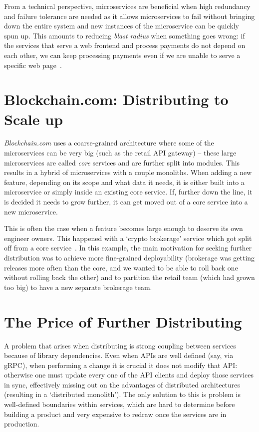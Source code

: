 \documentclass[conference]{IEEEtran}
\begin{document}
    From a technical perspective, microservices are beneficial when high redundancy and failure tolerance are needed as it allows microservices to fail without bringing down the entire system and new instances of the microservice can be quickly spun up. This amounts to reducing \emph{blast radius} when something
    goes wrong: if the services that serve a web frontend and process payments do
    not depend on each other, we can keep processing payments even if we are unable
    to serve a specific web page~\cite{blastRadius}.



    \section{Blockchain.com: Distributing to Scale up}
    \textit{Blockchain.com} uses a coarse-grained architecture where some of the microservices can be very big
    (such as the retail API gateway) -- these large microservices are called \emph{core} services and are further split into modules.
    This results in a hybrid of microservices with a couple monoliths.
    When adding a new feature, depending on its scope and what data it needs, it is either built into a microservice or simply inside an existing core service.
    If, further down the line, it is decided it needs to grow further, it can get moved out of a core service into a new microservice.

    This is often the case when a feature becomes large enough to deserve its own engineer owners.
    This happened with a `crypto brokerage' service which got split off from a core service~\cite{bcBrokerageSplit}.
    In this example, the main motivation for seeking further distribution was to achieve more fine-grained deployability (brokerage was getting releases more often than the core, and we wanted to be able to roll back one without rolling back the other) and to partition the retail team (which had grown too big) to have a new separate brokerage team.


    \section{The Price of Further Distributing}

    A problem that arises when distributing is strong coupling between services because of library dependencies. Even when APIs are well defined (say, via gRPC), when performing a change it is crucial it does not modify that API: otherwise one must update every one of the API clients and deploy those services in sync, effectively missing out on the advantages of distributed architectures (resulting in a `distributed monolith').
    The only solution to this is problem is well-defined boundaries within services, which are hard to determine before building a product and very expensive to redraw once the services are in production.
\end{document}

